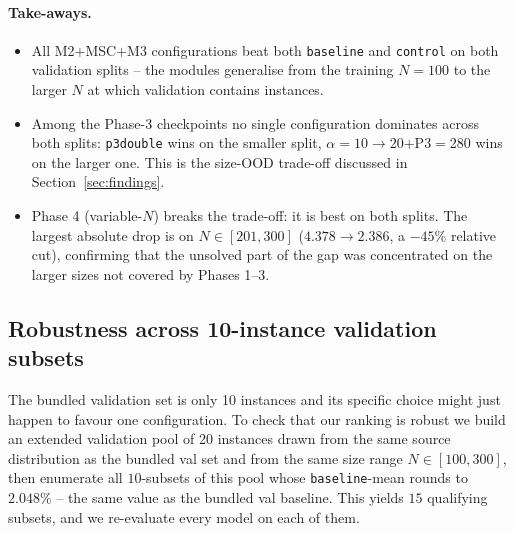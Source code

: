 \documentclass[11pt,a4paper]{article}
\begin{document}
\paragraph{Take-aways.}
%
\begin{itemize}
  \item All M2+MSC+M3 configurations beat both \texttt{baseline} and
        \texttt{control} on both validation splits -- the modules
        generalise from the training $N\!=\!100$ to the larger $N$ at
        which validation contains instances.
  \item Among the Phase-3 checkpoints no single configuration dominates
        across both splits: \texttt{p3double} wins on the smaller split,
        $\alpha\!=\!10\!\to\!20$+P3$=$280 wins on the larger one. This
        is the size-OOD trade-off discussed in
        Section~\ref{sec:findings}.
  \item Phase 4 (variable-$N$) breaks the trade-off: it is best on both
        splits. The largest absolute drop is on $N\!\in\![201,300]$
        ($4.378 \to 2.386$, a $-45\%$ relative cut), confirming that the
        unsolved part of the gap was concentrated on the larger sizes
        not covered by Phases 1--3.
\end{itemize}

\subsection{Robustness across 10-instance validation subsets}
\label{sec:robust}

The bundled validation set is only 10 instances and its specific choice
might just happen to favour one configuration. To check that our ranking is
robust we build an extended validation pool of 20 instances drawn from the
same source distribution as the bundled val set and from the same size
range $N\!\in\![100,300]$, then enumerate all $10$-subsets of this pool
whose \texttt{baseline}-mean rounds to $2.048\%$ -- the same value as the
bundled val baseline. This yields $15$ qualifying subsets, and we
re-evaluate every model on each of them.
\end{document}
